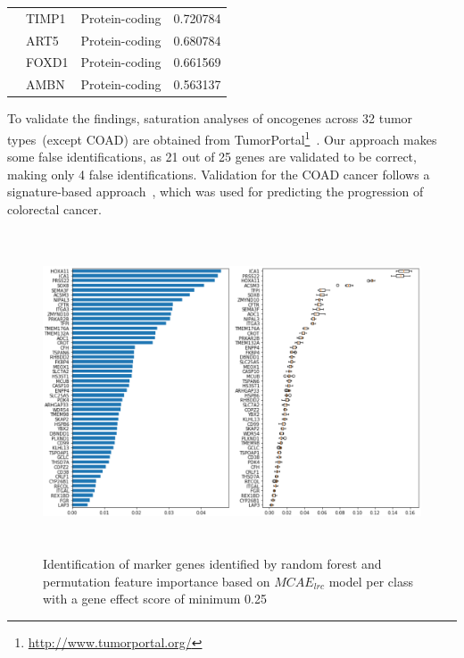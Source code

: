 \begin{table}
\begin{center}
\begin{tabular}{l|l|l|l}
        & TIMP1 & Protein-coding & 0.720784 \\ %
        & ART5 & Protein-coding & 0.680784 \\ %
        & FOXD1 & Protein-coding & 0.661569 \\ %
        & AMBN & Protein-coding & 0.563137 \\ %
        \bottomrule
        \end{tabular}
        \vspace{-4mm}
    \end{center}
\end{table}

\hspace*{3.5mm} To validate the findings, saturation analyses of oncogenes across 32 tumor types~(except COAD) are obtained from TumorPortal\footnote{ \url{http://www.tumorportal.org/}}~\cite{lawrence2014discovery}. Our approach makes some false identifications, as 21 out of 25 genes are validated to be correct, making only 4 false identifications. Validation for the COAD cancer follows a signature-based approach~\cite{zuo2019identification}, which was used for predicting the progression of colorectal cancer. 

\begin{figure}[h]
\centering
	\includegraphics[width=0.8\linewidth,height=95mm]{images/rf_fi.png}
	\caption{Identification of marker genes identified by random forest and permutation feature importance based on $MCAE_{lrc}$ model per class with a gene effect score of minimum 0.25}
    \label{fig:pfi}
\end{figure}

